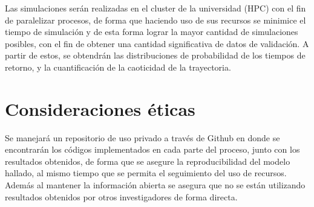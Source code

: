 	Las simulaciones ser\'an realizadas en el cluster de la universidad (HPC) con el fin de paralelizar procesos, de forma que haciendo uso de sus recursos se minimice el tiempo de simulación y de esta forma lograr la mayor cantidad de simulaciones posibles, con el fin de obtener una cantidad significativa de datos de validación. A partir de estos, se obtendr\'an las distribuciones de probabilidad de los tiempos de retorno, y la cuantificaci\'on de la caoticidad de la trayectoria.
	
\section{Consideraciones éticas}
	Se manejará un repositorio de uso privado a través de Github en donde se encontrar\'an los códigos implementados en cada parte del proceso, junto con los resultados obtenidos, de forma que se asegure la reproducibilidad del modelo hallado, al mismo tiempo que se permita el seguimiento del uso de recursos. Adem\'as al mantener la informaci\'on abierta se asegura que no se están utilizando resultados obtenidos por otros investigadores de forma directa.
	
